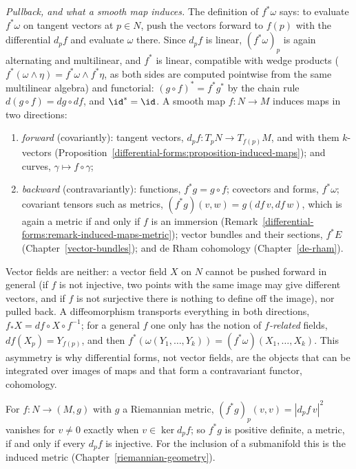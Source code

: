 \begin{remark}\label{differential-forms:remark-induced-maps}
\emph{Pullback, and what a smooth map induces.} The definition of $f^*\omega$ says: to evaluate $f^*\omega$ on tangent vectors at $p \in N$, push the vectors forward to $f(p)$ with the differential $d_pf$ and
evaluate $\omega$ there. Since $d_pf$ is linear, $(f^*\omega)_p$ is again alternating and multilinear, and $f^*$ is linear, compatible with wedge products ($f^*(\omega \wedge \eta) = f^*\omega \wedge f^*\eta$, as
both sides are computed pointwise from the same multilinear algebra) and functorial: $(g \circ f)^* = f^*g^*$ by the chain rule $d(g \circ f) = dg \circ df$, and $\id^* = \id$. A smooth map
$f \colon N \to M$ induces maps in two directions:
\begin{enumerate}
\item \emph{forward} (covariantly): tangent vectors, $d_pf \colon T_pN \to T_{f(p)}M$, and with them $k$-vectors
(Proposition~\ref{differential-forms:proposition-induced-maps}); and curves, $\gamma \mapsto f \circ \gamma$;
\item \emph{backward} (contravariantly): functions, $f^*g = g \circ f$; covectors and forms, $f^*\omega$; covariant tensors such as metrics, $(f^*g)(v, w) = g(df\,v, df\,w)$, which is again a metric if and only if
$f$ is an immersion (Remark~\ref{differential-forms:remark-induced-maps-metric}); vector bundles and their sections, $f^*E$ (Chapter~\ref{vector-bundles}); and de Rham cohomology (Chapter~\ref{de-rham}).
\end{enumerate}
Vector fields are neither: a vector field $X$ on $N$ cannot be pushed forward in general (if $f$ is not injective, two points with the same image may give different vectors, and if $f$ is not surjective
there is nothing to define off the image), nor pulled back. A diffeomorphism transports everything in both directions, $f_*X = df \circ X \circ f^{-1}$; for a general $f$ one only has the notion of
\emph{$f$-related} fields, $df(X_p) = Y_{f(p)}$, and then $f^*(\omega(Y_1, \ldots, Y_k)) = (f^*\omega)(X_1, \ldots, X_k)$. This asymmetry is why differential forms, not vector fields, are the objects that
can be integrated over images of maps and that form a contravariant functor, cohomology.
\end{remark}

\begin{remark}\label{differential-forms:remark-induced-maps-metric}
For $f \colon N \to (M, g)$ with $g$ a Riemannian metric, $(f^*g)_p(v, v) = |d_pf\,v|^2$ vanishes for $v \neq 0$ exactly when $v \in \ker d_pf$; so $f^*g$ is positive definite, a metric, if and only if every $d_pf$ is
injective. For the inclusion of a submanifold this is the induced metric (Chapter~\ref{riemannian-geometry}).
\end{remark}

